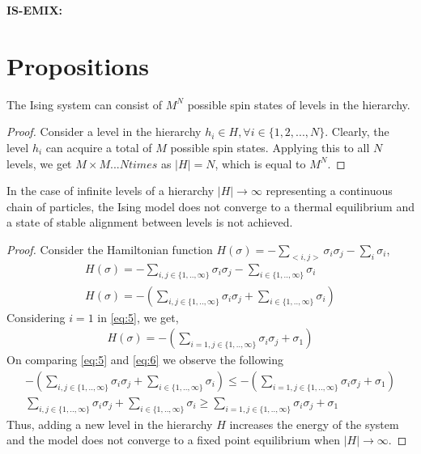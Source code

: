\documentclass{article}
\begin{document}
\textbf{IS-EMIX:}


\section{Propositions}

\begin{prop}{1}\label{one}
    The Ising system can consist of $M^{N}$ possible spin states of levels in the hierarchy.
\end{prop}
\begin{proof}
    Consider a level in the hierarchy $h_{i} \in H, \forall i \in \{1,2,...,N\}$. Clearly, the level $h_{i}$ can acquire a total of $M$ possible spin states. Applying this to all $N$ levels, we get $M \times M... N times$ as $|H| = N$, which is equal to $M^{N}$.  
\end{proof}

\begin{prop}{2}\label{two}
    In the case of infinite levels of a hierarchy $|H| \to \infty$ representing a continuous chain of particles, the Ising model does not converge to a thermal equilibrium and a state of stable alignment between levels is not achieved.  
\end{prop}
\begin{proof}
    Consider the Hamiltonian function $H(\sigma) = - \underset{<i,j>}{\sum} \sigma_{i}\sigma_{j} - \underset{i}{\sum}\sigma_{i}$,\\
    \begin{gather}
        H(\sigma) = - \underset{i,j \in \{1,..,\infty\}}{\sum}\sigma_{i}\sigma_{j} - \underset{i \in \{1,..,\infty\}}{\sum}\sigma_{i} \nonumber \\
        H(\sigma) = - (\underset{i,j \in \{1,..,\infty\}}{\sum}\sigma_{i}\sigma_{j} + \underset{i \in \{1,..,\infty\}}{\sum}\sigma_{i}) \label{eq:5}
    \end{gather}
    Considering $i = 1$ in \autoref{eq:5}, we get,
    \begin{gather}
        H(\sigma) = - (\underset{i=1,j \in \{1,..,\infty\}}{\sum}\sigma_{i}\sigma_{j} + \sigma_{1}) \label{eq:6}
    \end{gather}
    On comparing \autoref{eq:5} and \autoref{eq:6} we observe the following
    \begin{gather}
        - (\underset{i,j \in \{1,..,\infty\}}{\sum}\sigma_{i}\sigma_{j} + \underset{i \in \{1,..,\infty\}}{\sum}\sigma_{i}) \leq - (\underset{i=1,j \in \{1,..,\infty\}}{\sum}\sigma_{i}\sigma_{j} + \sigma_{1}) \nonumber \\
        \underset{i,j \in \{1,..,\infty\}}{\sum}\sigma_{i}\sigma_{j} + \underset{i \in \{1,..,\infty\}}{\sum}\sigma_{i} \geq \underset{i=1,j \in \{1,..,\infty\}}{\sum}\sigma_{i}\sigma_{j} + \sigma_{1} \nonumber
    \end{gather}
    Thus, adding a new level in the hierarchy $H$ increases the energy of the system and the model does not converge to a fixed point equilibrium when $|H| \to \infty$.
\end{proof}
\end{document}
